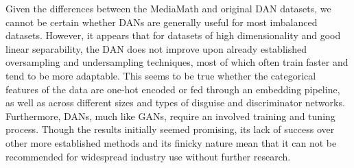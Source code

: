 \documentclass{proc}
\begin{document}
Given the differences between the MediaMath and original DAN datasets, we cannot be certain whether DANs are generally useful for most imbalanced datasets. However, it appears that for datasets of high dimensionality and good linear separability, the DAN does not improve upon already established oversampling and undersampling techniques, most of which often train faster and tend to be more adaptable. This seems to be true whether the categorical features of the data are one-hot encoded or fed through an embedding pipeline, as well as across different sizes and types of disguise and discriminator networks. Furthermore, DANs, much like GANs, require an involved training and tuning process. Though the results initially seemed promising, its lack of success over other more established methods and its finicky nature mean that it can not be recommended for widespread industry use without further research.

\printbibliography
\end{document}

